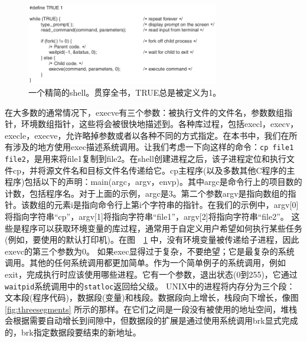 	\begin{figure}[ht]\small
		\centering
		\includegraphics[width=0.75\textwidth]{FIG/1-19.png}
		\caption{一个精简的shell。贯穿全书，TRUE总是被定义为1。}\label{fig:simpleshell}
	\end{figure}

	在大多数的通常情况下，execve有三个参数：被执行文件的文件名，参数数组指针，环境数组指针，这些将会被很快地描述到。各种库过程，包括execl，execv，execle，execve，允许略掉参数或者以各种不同的方式指定。在本书中，我们在所有涉及的地方使用exec描述系统调用。让我们考虑一下向这样的命令：\texttt{cp file1 file2}，是用来将file1复制到file2。在shell创建进程之后，该子进程定位和执行文件cp，并将源文件名和目标文件名传递给它。cp主程序(以及多数其他C程序的主程序)包括以下的声明：main(argc，argv，envp)。其中argc是命令行上的项目数的计数，包括程序名。对于上面的示例，argc是3。第二个参数argv是指向数组的指针。该数组的元素i是指向命令行上第i个字符串的指针。在我们的示例中，argv[0]将指向字符串“cp”，argv[1]将指向字符串“file1”，argv[2]将指向字符串“file2”。 
	这些是程序可以获取环境变量的库过程，通常用于自定义用户希望如何执行某些任务(例如，要使用的默认打印机)。在图　\ref{fig:simpleshell} 中，没有环境变量被传递给子进程，因此exevc的第三个参数为0。
	如果exec显得过于复杂，不要绝望；它是最复杂的系统调用。其他的任何系统调用都更加简单。作为一个简单例子的系统调用，例如exit，完成执行时应该使用哪些进程。它有一个参数，退出状态(0到255)，它通过\texttt{waitpid}系统调用中的\texttt{statloc}返回给父级。
	UNIX中的进程将内存分为三个段：文本段(程序代码)，数据段(变量)和栈段。数据段向上增长，栈段向下增长，像图　\ref{fig:threesegments} 所示的那样。在它们之间是一段没有被使用的地址空间，堆栈会根据需要自动增长到间隙中，但数据段的扩展是通过使用系统调用brk显式完成的，brk指定数据段要结束的新地址。
	 

